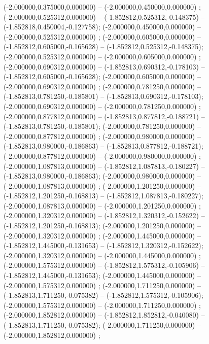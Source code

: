  (-2.000000,0.375000,0.000000) -- (-2.000000,0.450000,0.000000) ;
 (-2.000000,0.525312,0.000000) -- (-1.852812,0.525312,-0.148375) -- (-1.852818,0.450004,-0.127758);
 (-2.000000,0.450000,0.000000) -- (-2.000000,0.525312,0.000000) ;
 (-2.000000,0.605000,0.000000) -- (-1.852812,0.605000,-0.165628) -- (-1.852812,0.525312,-0.148375);
 (-2.000000,0.525312,0.000000) -- (-2.000000,0.605000,0.000000) ;
 (-2.000000,0.690312,0.000000) -- (-1.852813,0.690312,-0.178103) -- (-1.852812,0.605000,-0.165628);
 (-2.000000,0.605000,0.000000) -- (-2.000000,0.690312,0.000000) ;
 (-2.000000,0.781250,0.000000) -- (-1.852813,0.781250,-0.185801) -- (-1.852813,0.690312,-0.178103);
 (-2.000000,0.690312,0.000000) -- (-2.000000,0.781250,0.000000) ;
 (-2.000000,0.877812,0.000000) -- (-1.852813,0.877812,-0.188721) -- (-1.852813,0.781250,-0.185801);
 (-2.000000,0.781250,0.000000) -- (-2.000000,0.877812,0.000000) ;
 (-2.000000,0.980000,0.000000) -- (-1.852813,0.980000,-0.186863) -- (-1.852813,0.877812,-0.188721);
 (-2.000000,0.877812,0.000000) -- (-2.000000,0.980000,0.000000) ;
 (-2.000000,1.087813,0.000000) -- (-1.852812,1.087813,-0.180227) -- (-1.852813,0.980000,-0.186863);
 (-2.000000,0.980000,0.000000) -- (-2.000000,1.087813,0.000000) ;
 (-2.000000,1.201250,0.000000) -- (-1.852812,1.201250,-0.168813) -- (-1.852812,1.087813,-0.180227);
 (-2.000000,1.087813,0.000000) -- (-2.000000,1.201250,0.000000) ;
 (-2.000000,1.320312,0.000000) -- (-1.852812,1.320312,-0.152622) -- (-1.852812,1.201250,-0.168813);
 (-2.000000,1.201250,0.000000) -- (-2.000000,1.320312,0.000000) ;
 (-2.000000,1.445000,0.000000) -- (-1.852812,1.445000,-0.131653) -- (-1.852812,1.320312,-0.152622);
 (-2.000000,1.320312,0.000000) -- (-2.000000,1.445000,0.000000) ;
 (-2.000000,1.575312,0.000000) -- (-1.852812,1.575312,-0.105906) -- (-1.852812,1.445000,-0.131653);
 (-2.000000,1.445000,0.000000) -- (-2.000000,1.575312,0.000000) ;
 (-2.000000,1.711250,0.000000) -- (-1.852813,1.711250,-0.075382) -- (-1.852812,1.575312,-0.105906);
 (-2.000000,1.575312,0.000000) -- (-2.000000,1.711250,0.000000) ;
 (-2.000000,1.852812,0.000000) -- (-1.852812,1.852812,-0.040080) -- (-1.852813,1.711250,-0.075382);
 (-2.000000,1.711250,0.000000) -- (-2.000000,1.852812,0.000000) ;
